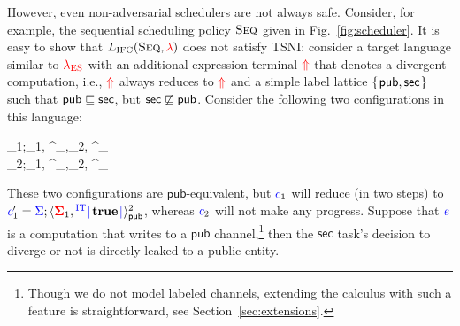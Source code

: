 \documentclass{llncs}
\newcommand{\Varid}[1]{\mathit{#1}}
\def\resethooks{\global\let\SaveRestoreHook\empty
  \global\let\ColumnHook\empty}
\let\hspost\empty
\newcommand{\Red}[1]{{\color{red} #1}}
\begin{document}
However, even non-adversarial schedulers are not always safe.
Consider, for example, the sequential scheduling policy \ensuremath{\textsc{Seq}} given in
Fig.~\ref{fig:scheduler}.
It is easy to show that \ensuremath{L_\text{IFC}(\textsc{Seq},\Red{\lambda})} does not satisfy
TSNI:
consider a target language similar to \ensuremath{\Red{\lambda_{\text{ES}}}} with an
additional expression terminal \ensuremath{\tar{\Uparrow}} that denotes a divergent computation,
i.e., \ensuremath{\tar{\Uparrow}} always reduces to \ensuremath{\tar{\Uparrow}} and a simple label lattice \ensuremath{\{\mskip1.5mu \mathsf{pub},\mathsf{sec}\mskip1.5mu\}} such that \ensuremath{\mathsf{pub}\flows{}\mathsf{sec}}, but \ensuremath{\mathsf{sec}\not\flows{}\mathsf{pub}}.
Consider the following two configurations in this language:
\begin{hscode}\SaveRestoreHook
\column{B}{@{}>{\hspre}l<{\hspost}@{}}\column{71}{@{}>{\hspre}l<{\hspost}@{}}\column{E}{@{}>{\hspre}l<{\hspost}@{}}\>[B]{}_{1}\mathrel{=}\ifc{\Sigma};\langle \tar{\Sigma}_{1}, \;\;\;\;\tar{\Uparrow}\;\;\ifc{\rceil}\rangle^{}_{},{}\<[71]\>[71]{}\langle \tar{\Sigma}_{2}, \ifc{\Varid{e}}\rangle^{}_{}{}\<[E]\\
\>[B]{}_{2}\mathrel{=}\ifc{\Sigma};\langle \tar{\Sigma}_{1}, \;\;\;\;\tar{\Uparrow}\;\;\ifc{\rceil}\rangle^{}_{},{}\<[71]\>[71]{}\langle \tar{\Sigma}_{2}, \ifc{\Varid{e}}\rangle^{}_{}{}\<[E]\ColumnHook
\end{hscode}\resethooks
These two configurations are \ensuremath{\mathsf{pub}}-equivalent, but \ensuremath{\ifc{c}_{1}} will reduce
(in two steps)
to \ensuremath{\ifc{c}_{1}'\mathrel{=}\ifc{\Sigma};\langle \tar{\Sigma}_{1}, \ifc{^{\textrm{IT}}\lceil}\mathbf{true}\ifc{\rceil}\rangle^{\mathrm{2}}_{\mathsf{pub}}}, whereas \ensuremath{\ifc{c}_{2}} will not make
any progress.
Suppose that \ensuremath{\ifc{\Varid{e}}} is a computation that writes to a \ensuremath{\mathsf{pub}} channel,\footnote{
Though we do not model labeled channels, extending the calculus with such a
feature is straightforward, see Section~\ref{sec:extensions}.}
then the \ensuremath{\mathsf{sec}} task's decision to diverge or not is directly leaked to a
public entity.
\end{document}

